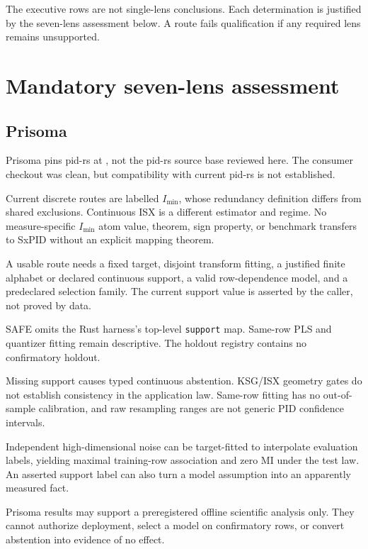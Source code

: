 \documentclass[11pt]{article}
\newcommand{\Imin}{I_{\min}}
\newcommand{\Commit}[1]{\texttt{\seqsplit{#1}}}
\begin{document}
The executive rows are not single-lens conclusions.  Each determination is
justified by the seven-lens assessment below.  A route fails qualification if
any required lens remains unsupported.

\section{Mandatory seven-lens assessment}

\subsection{Prisoma}

\begin{description}[style=nextline,font=\bfseries]
\item[Provenance] Prisoma pins pid-rs at
\Commit{796c11e70f009634b853dc4ada6f565563d82f51}, not the pid-rs source base
reviewed here.  The consumer checkout was clean, but compatibility with current
pid-rs is not established.
\item[SxPID estimand compatibility] Current discrete routes are labelled
$\Imin$, whose redundancy definition differs from shared exclusions.
Continuous ISX is a different estimator and regime.  No measure-specific
$\Imin$ atom value, theorem, sign property, or benchmark transfers to SxPID
without an explicit mapping theorem.
\item[Mathematical assumptions] A usable route needs a fixed target, disjoint
transform fitting, a justified finite alphabet or declared continuous support,
a valid row-dependence model, and a predeclared selection family.  The current
support value is asserted by the caller, not proved by data.
\item[Implementation and API] SAFE omits the Rust harness's top-level
\texttt{support} map.  Same-row PLS and quantizer fitting remain descriptive.
The holdout registry contains no confirmatory holdout.
\item[Numerical and statistical validity] Missing support causes typed
continuous abstention.  KSG/ISX geometry gates do not establish consistency in
the application law.  Same-row fitting has no out-of-sample calibration, and
raw resampling ranges are not generic PID confidence intervals.
\item[Adversarial and operational misuse] Independent high-dimensional noise
can be target-fitted to interpolate evaluation labels, yielding maximal
training-row association and zero MI under the test law.  An asserted support label can
also turn a model assumption into an apparently measured fact.
\item[Authority] Prisoma results may support a preregistered offline scientific
analysis only.  They cannot authorize deployment, select a model on
confirmatory rows, or convert abstention into evidence of no effect.
\end{description}
\end{document}
